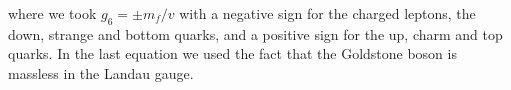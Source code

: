 where we took $g_6= \pm m_f/v$ with a negative sign for the charged leptons, the down, strange and bottom quarks, and a positive sign for the up, charm and top quarks. In the last equation we used the fact that the Goldstone boson is massless in the Landau gauge.























